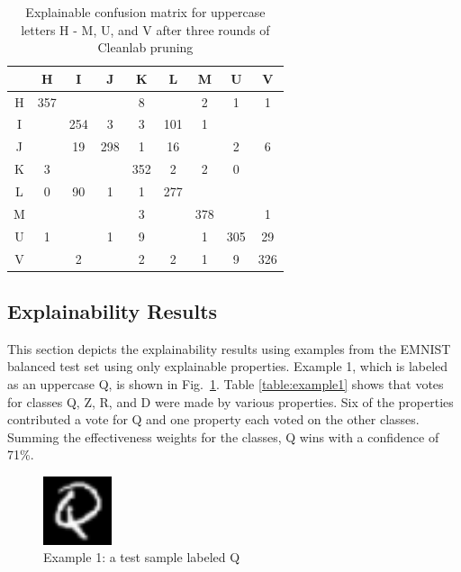 \documentclass[conference]{IEEEtran}
\begin{document}
\begin{table}
    \centering
    \caption{Explainable confusion matrix for uppercase letters H - M, U, and V after three rounds of Cleanlab pruning}
    \begin{tabular}{ |c|c|c|c|c|c|c|c|c|}
    \hline
    ~ & H & I & J & K & L & M & U & V \\
    \hline
    H & 357 & &  & 8 & & 2 & 1 & 1 \\
    \hline
    I &  & 254 & 3 & 3 & 101 & 1 & & \\
    \hline
    J & & 19 & 298 & 1 & 16 & & 2 & 6 \\
    \hline
    K & 3 &  &  & 352 & 2 & 2 & 0 & \\
    \hline
    L & 0 & 90 & 1 & 1 & 277 & & & \\
    \hline
    M & & & & 3 & & 378 & & 1 \\
    \hline
    U & 1 & & 1 & 9 & & 1 & 305 & 29 \\
    \hline
    V & & 2 & & 2 & 2 & 1 & 9 & 326 \\
    \hline
    \end{tabular}
    \label{raw_cap_cleanlab_third_confusion_matrix}
\end{table}


\subsection{Explainability Results}


This section depicts the explainability results using examples from the EMNIST
balanced test set using only explainable properties.  Example 1, which is labeled as an uppercase Q, is shown in
Fig.~\ref{fig:ex1}.  Table \ref{table:example1} shows that votes for classes Q,
Z, R, and D were made by various properties.  Six of the properties contributed
a vote for Q and one property each voted on the other classes.  Summing the
effectiveness weights for the classes, Q wins with a confidence of 71\%.

\begin{figure}
    \centering
    \includegraphics[width=2cm]{./images/examples/test-Q-0.png}
    \caption{Example 1: a test sample labeled Q}
    \label{fig:ex1}
\end{figure}
\end{document}
